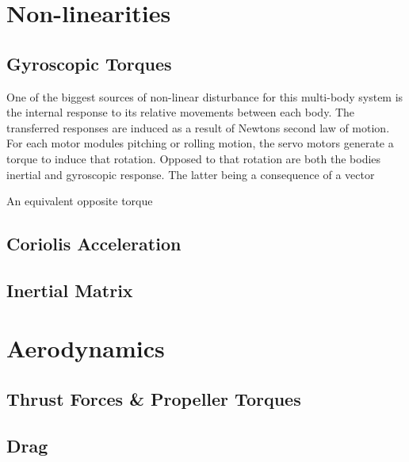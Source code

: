 \section{Non-linearities}
\label{sec:dynamics.nonlinearities}
\subsection{Gyroscopic Torques}
\label{subsec:dynamics.nonlinearities.gyrotorques}
One of the biggest sources of non-linear disturbance for this multi-body system is the internal response to its relative movements between each body. The transferred responses are induced as a result of Newtons second law of motion. For each motor modules pitching or rolling motion, the servo motors generate a torque to induce that rotation. Opposed to that rotation are both the bodies inertial and gyroscopic response. The latter being a consequence of a vector 

An equivalent opposite torque 
\subsection{Coriolis Acceleration}
\label{subsec:dynamics.nonlinearities.coriolis}
\subsection{Inertial Matrix}
\label{subsec:dynamics.nonlinearities.inertia}

\section{Aerodynamics}
\label{sec:dynamics.aero}
\subsection{Thrust Forces \& Propeller Torques}
\label{subsec:dynamics.aero.bem}
\subsection{Drag}
\label{subsec:dynamics.aero.drag}
